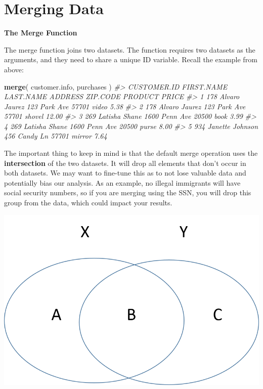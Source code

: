 \documentclass[]{book}
\newenvironment{Shaded}{\begin{snugshade}}{\end{snugshade}}
\newcommand{\CommentTok}[1]{\textcolor[rgb]{0.56,0.35,0.01}{\textit{#1}}}
\newcommand{\KeywordTok}[1]{\textcolor[rgb]{0.13,0.29,0.53}{\textbf{#1}}}
\newcommand{\NormalTok}[1]{#1}
\theoremstyle{definition}
\theoremstyle{definition}
\theoremstyle{definition}
\theoremstyle{remark}
\begin{document}
\hypertarget{merging-data-1}{%
\section{Merging Data}\label{merging-data-1}}

\textbf{The Merge Function}

The merge function joins two datasets. The function requires two
datasets as the arguments, and they need to share a unique ID variable.
Recall the example from above:

\begin{Shaded}
\begin{Highlighting}[]

\KeywordTok{merge}\NormalTok{( customer.info, purchases )}
\CommentTok{#>   CUSTOMER.ID FIRST.NAME LAST.NAME       ADDRESS ZIP.CODE PRODUCT PRICE}
\CommentTok{#> 1         178     Alvaro    Jaurez  123 Park Ave    57701   video  5.38}
\CommentTok{#> 2         178     Alvaro    Jaurez  123 Park Ave    57701  shovel 12.00}
\CommentTok{#> 3         269    Latisha     Shane 1600 Penn Ave    20500    book  3.99}
\CommentTok{#> 4         269    Latisha     Shane 1600 Penn Ave    20500   purse  8.00}
\CommentTok{#> 5         934    Janette   Johnson  456 Candy Ln    57701  mirror  7.64}
\end{Highlighting}
\end{Shaded}

The important thing to keep in mind is that the default merge operation
uses the \textbf{intersection} of the two datasets. It will drop all
elements that don't occur in both datasets. We may want to fine-tune
this as to not lose valuable data and potentially bias our analysis. As
an example, no illegal immigrants will have social security numbers, so
if you are merging using the SSN, you will drop this group from the
data, which could impact your results.

\includegraphics{figures/xy.png}
\end{document}
